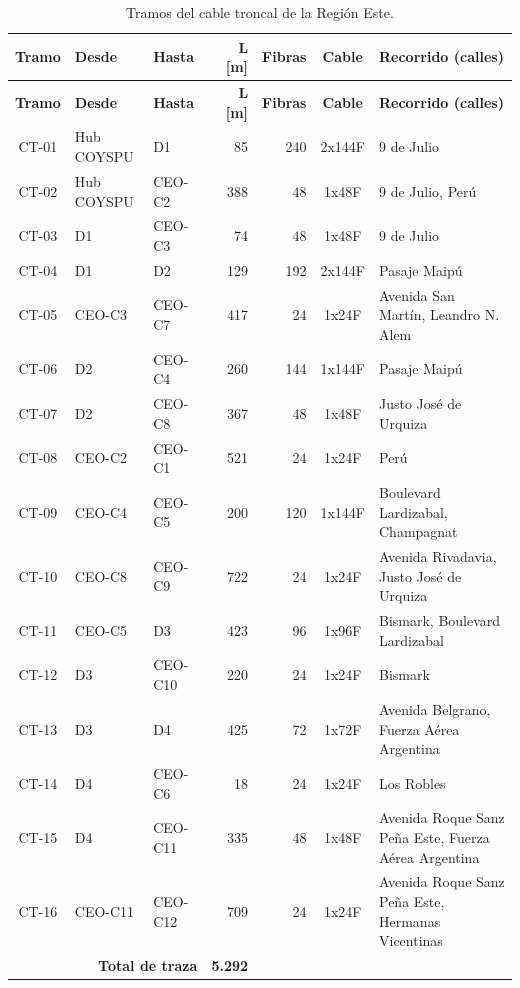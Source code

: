 \footnotesize\setlength{\tabcolsep}{4pt}\begin{longtable}{|c|l|l|r|r|c|p{4.2cm}|}
\caption{Tramos del cable troncal de la Región Este.}\label{tab:tramos}\\ \hline
\textbf{Tramo} & \textbf{Desde} & \textbf{Hasta} & \textbf{L [m]} & \textbf{Fibras} & \textbf{Cable} & \textbf{Recorrido (calles)} \\ \hline \endfirsthead
\hline \textbf{Tramo} & \textbf{Desde} & \textbf{Hasta} & \textbf{L [m]} & \textbf{Fibras} & \textbf{Cable} & \textbf{Recorrido (calles)} \\ \hline \endhead
CT-01 & Hub COYSPU & D1 & 85 & 240 & 2x144F & 9 de Julio \\ \hline
CT-02 & Hub COYSPU & CEO-C2 & 388 & 48 & 1x48F & 9 de Julio, Perú \\ \hline
CT-03 & D1 & CEO-C3 & 74 & 48 & 1x48F & 9 de Julio \\ \hline
CT-04 & D1 & D2 & 129 & 192 & 2x144F & Pasaje Maipú \\ \hline
CT-05 & CEO-C3 & CEO-C7 & 417 & 24 & 1x24F & Avenida San Martín, Leandro N. Alem \\ \hline
CT-06 & D2 & CEO-C4 & 260 & 144 & 1x144F & Pasaje Maipú \\ \hline
CT-07 & D2 & CEO-C8 & 367 & 48 & 1x48F & Justo José de Urquiza \\ \hline
CT-08 & CEO-C2 & CEO-C1 & 521 & 24 & 1x24F & Perú \\ \hline
CT-09 & CEO-C4 & CEO-C5 & 200 & 120 & 1x144F & Boulevard Lardizabal, Champagnat \\ \hline
CT-10 & CEO-C8 & CEO-C9 & 722 & 24 & 1x24F & Avenida Rivadavia, Justo José de Urquiza \\ \hline
CT-11 & CEO-C5 & D3 & 423 & 96 & 1x96F & Bismark, Boulevard Lardizabal \\ \hline
CT-12 & D3 & CEO-C10 & 220 & 24 & 1x24F & Bismark \\ \hline
CT-13 & D3 & D4 & 425 & 72 & 1x72F & Avenida Belgrano, Fuerza Aérea Argentina \\ \hline
CT-14 & D4 & CEO-C6 & 18 & 24 & 1x24F & Los Robles \\ \hline
CT-15 & D4 & CEO-C11 & 335 & 48 & 1x48F & Avenida Roque Sanz Peña Este, Fuerza Aérea Argentina \\ \hline
CT-16 & CEO-C11 & CEO-C12 & 709 & 24 & 1x24F & Avenida Roque Sanz Peña Este, Hermanas Vicentinas \\ \hline
\multicolumn{3}{|r|}{\textbf{Total de traza}} & \textbf{5.292} & \multicolumn{3}{l|}{} \\ \hline
\end{longtable}
